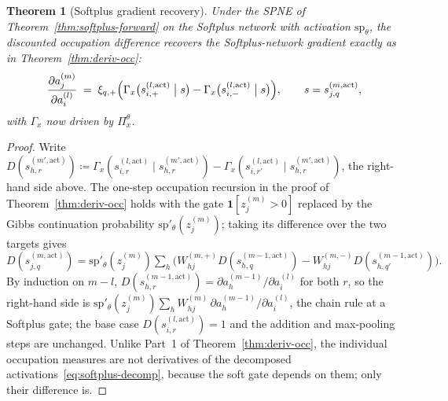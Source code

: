 \documentclass[twoside]{article}
\newcommand{\1}{\mathbf{1}}
\newtheorem{theorem}{Theorem}
\begin{document}
\begin{theorem}[Softplus gradient recovery]\label{thm:softplus-gradient}
Under the SPNE of Theorem~\ref{thm:softplus-forward} on the Softplus network with activation
$\mathrm{sp}_\theta$, the discounted occupation difference recovers the Softplus-network gradient
exactly as in Theorem~\ref{thm:deriv-occ}:
\begin{align}
    \frac{\partial a_j^{(m)}}{\partial a_i^{(l)}}
    \;=\;
    \xi_{q,+}\Bigl(\Gamma_x\bigl(s_{i,+}^{(l, \mathrm{act})} \bigm| s\bigr) -
    \Gamma_x\bigl(s_{i,-}^{(l, \mathrm{act})} \bigm| s\bigr)\Bigr),
    \qquad s = s_{j,q}^{(m, \mathrm{act})},
\end{align}
with $\Gamma_x$ now driven by $\Pi_x^\theta$.
\end{theorem}

\begin{proof}
Write $D(s_{h,r}^{(m',\mathrm{act})}) \coloneqq \Gamma_x(s_{i,r}^{(l,\mathrm{act})} \mid
    s_{h,r}^{(m',\mathrm{act})}) - \Gamma_x(s_{i,r'}^{(l,\mathrm{act})} \mid
    s_{h,r}^{(m',\mathrm{act})})$, the right-hand side above. The one-step occupation recursion in the
proof of Theorem~\ref{thm:deriv-occ} holds with the gate $\1[z_j^{(m)} > 0]$ replaced by the Gibbs
continuation probability $\mathrm{sp}'_\theta(z_j^{(m)})$; taking its difference over the two
targets gives
\(
    D(s_{j,q}^{(m,\mathrm{act})}) = \mathrm{sp}'_\theta(z_j^{(m)}) \sum_h \bigl( W_{hj}^{(m,+)}
    D(s_{h,q}^{(m-1,\mathrm{act})}) - W_{hj}^{(m,-)} D(s_{h,q'}^{(m-1,\mathrm{act})}) \bigr).
\)
By induction on $m-l$, $D(s_{h,r}^{(m-1,\mathrm{act})}) = \partial a_h^{(m-1)}/\partial a_i^{(l)}$
for both $r$, so the right-hand side is $\mathrm{sp}'_\theta(z_j^{(m)}) \sum_h W_{hj}^{(m)}\,
    \partial a_h^{(m-1)}/\partial a_i^{(l)}$, the chain rule at a Softplus gate; the base case
$D(s_{i,r}^{(l,\mathrm{act})}) = 1$ and the addition and max-pooling steps are unchanged. Unlike
Part~1 of Theorem~\ref{thm:deriv-occ}, the individual occupation measures are not derivatives of
the decomposed activations~\eqref{eq:softplus-decomp}, because the soft gate depends on them; only
their difference is.
\end{proof}
\end{document}
